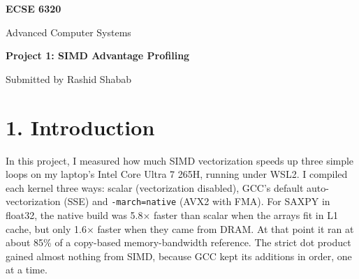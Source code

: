\documentclass[10pt,letterpaper]{article}
\begin{document}
\begin{titlepage}
\thispagestyle{empty}\centering
\vspace*{1.2in}
{\Large\bfseries ECSE 6320\par}
\vspace{0.3in}
{\Large Advanced Computer Systems\par}
\vspace{0.9in}
{\LARGE\bfseries Project 1: SIMD Advantage Profiling\par}
\vspace{0.9in}
{\large Submitted by Rashid Shabab\par}
\vfill
\end{titlepage}
\setcounter{page}{2}
{\setlength{\parskip}{0pt}\tableofcontents}\clearpage
{}
\section*{1. Introduction}

In this project, I measured how much SIMD vectorization speeds up three simple loops on my laptop's Intel Core Ultra 7 265H, running under WSL2. I compiled each kernel three ways: scalar (vectorization disabled), GCC's default auto-vectorization (SSE) and \texttt{-march=native} (AVX2 with FMA). For SAXPY in float32, the native build was 5.8$\times$ faster than scalar when the arrays fit in L1 cache, but only 1.6$\times$ faster when they came from DRAM. At that point it ran at about 85\% of a copy-based memory-bandwidth reference. The strict dot product gained almost nothing from SIMD, because GCC kept its additions in order, one at a time.
\end{document}
